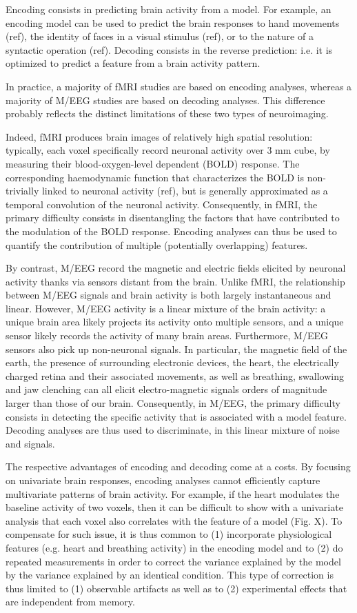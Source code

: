 \documentclass[runningheads]{llncs}
\begin{document}
Encoding consists in predicting brain activity from a model. For example, an encoding model can be used to predict the brain responses to hand movements (ref), the identity of faces in a visual stimulus (ref), or to the nature of a syntactic operation (ref).
Decoding consists in the reverse prediction: i.e. it is optimized to predict a feature from a brain activity pattern.

In practice, a majority of fMRI studies are based on encoding analyses, whereas a majority of M/EEG studies are based on decoding analyses. This difference probably reflects the distinct limitations of these two types of neuroimaging.

Indeed, fMRI produces brain images of relatively high spatial resolution: typically, each voxel specifically record neuronal activity over 3 mm cube, by measuring their blood-oxygen-level dependent (BOLD) response. The corresponding haemodynamic function that characterizes the BOLD is non-trivially linked to neuronal activity (ref), but is generally approximated as a temporal convolution of the neuronal activity. Consequently, in fMRI, the primary difficulty consists in disentangling the factors that have contributed to the modulation of the BOLD response. Encoding analyses can thus be used to quantify the contribution of multiple (potentially overlapping) features.

By contrast, M/EEG record the magnetic and electric fields elicited by neuronal activity thanks via sensors distant from the brain. Unlike fMRI, the relationship between M/EEG signals and brain activity is both largely instantaneous and linear. However, M/EEG activity is a linear mixture of the brain activity: a unique brain area likely projects its activity onto multiple sensors, and a unique sensor likely records the activity of many brain areas. Furthermore, M/EEG sensors also pick up non-neuronal signals. In particular, the magnetic field of the earth, the presence of surrounding electronic devices, the heart, the electrically charged retina and their associated movements, as well as breathing, swallowing and jaw clenching can all elicit electro-magnetic signals orders of magnitude larger than those of our brain. Consequently, in M/EEG, the primary difficulty consists in detecting the specific activity that is associated with a model feature. Decoding analyses are thus used to discriminate, in this linear mixture of noise and signals.

The respective advantages of encoding and decoding come at a costs. By focusing on univariate brain responses, encoding analyses cannot efficiently capture multivariate patterns of brain activity. For example, if the heart modulates the baseline activity of two voxels, then it can be difficult to show with a univariate analysis that each voxel also correlates with the feature of a model (Fig. X). To compensate for such issue, it is thus common to (1) incorporate physiological features (e.g. heart and breathing activity) in the encoding model and to (2) do repeated measurements in order to correct the variance explained by the model by the variance explained by an identical condition. This type of correction is thus limited to (1) observable artifacts as well as to (2) experimental effects that are independent from memory.
\end{document}
